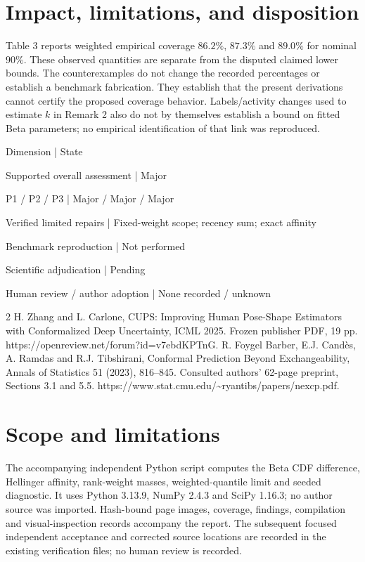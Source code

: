 \documentclass[10pt]{article}
\begin{document}
\section*{Impact, limitations, and disposition}
Table 3 reports weighted empirical coverage \(86.2\%\), \(87.3\%\) and \(89.0\%\) for nominal \(90\%\). These observed quantities are separate from the disputed claimed lower bounds. The counterexamples do not change the recorded percentages or establish a benchmark fabrication. They establish that the present derivations cannot certify the proposed coverage behavior. Labels/activity changes used to estimate \(k\) in Remark 2 also do not by themselves establish a bound on fitted Beta parameters; no empirical identification of that link was reproduced.\par
Dimension | State\par
Supported overall assessment | Major\par
P1 / P2 / P3 | Major / Major / Major\par
Verified limited repairs | Fixed-weight scope; recency sum; exact affinity\par
Benchmark reproduction | Not performed\par
Scientific adjudication | Pending\par
Human review / author adoption | None recorded / unknown\par
2 H. Zhang and L. Carlone, CUPS: Improving Human Pose-Shape Estimators with Conformalized Deep Uncertainty, ICML 2025. Frozen publisher PDF, 19 pp. https://openreview.net/forum?id=v7ebdKPTnG. R. Foygel Barber, E.J. Candès, A. Ramdas and R.J. Tibshirani, Conformal Prediction Beyond Exchangeability, Annals of Statistics 51 (2023), 816–845. Consulted authors’ 62-page preprint, Sections 3.1 and 5.5. https://www.stat.cmu.edu/\textasciitilde{}ryantibs/papers/nexcp.pdf.\par
\section*{Scope and limitations}
The accompanying independent Python script computes the Beta CDF difference, Hellinger affinity, rank-weight masses, weighted-quantile limit and seeded diagnostic. It uses Python 3.13.9, NumPy 2.4.3 and SciPy 1.16.3; no author source was imported. Hash-bound page images, coverage, findings, compilation and visual-inspection records accompany the report. The subsequent focused independent acceptance and corrected source locations are recorded in the existing verification files; no human review is recorded.\par
\end{document}

